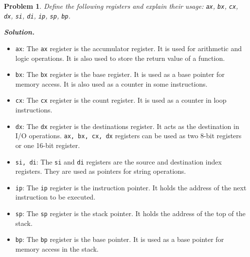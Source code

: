 \documentclass[12pt]{article}
\newtheorem{problem}{Problem}
\newenvironment{solution}[1][\it{Solution}]{\textbf{#1. } }{}
\begin{document}
\begin{problem}
    Define the following registers and explain their usage: \texttt{ax}, \texttt{bx}, \texttt{cx}, \texttt{dx}, \texttt{si}, \texttt{di}, \texttt{ip}, \texttt{sp}, \texttt{bp}.
\end{problem}
\begin{solution}
    
\end{solution}
    \begin{itemize}
        \item \texttt{ax}: The \texttt{ax} register is the accumulator register. It is used for arithmetic and logic operations. It is also used to store the return value of a function.
        \item \texttt{bx}: The \texttt{bx} register is the base register. It is used as a base pointer for memory access. It is also used as a counter in some instructions.
        \item \texttt{cx}: The \texttt{cx} register is the count register. It is used as a counter in loop instructions.
        \item \texttt{dx}: The \texttt{dx} register is the destinations register. It acts as the destination in I/O operations. \texttt{ax, bx, cx, dx} registers can be used as two 8-bit registers or one 16-bit register.
        \item \texttt{si, di}: The \texttt{si} and \texttt{di} registers are the source and destination index registers. They are used as pointers for string operations.
        \item \texttt{ip}: The \texttt{ip} register is the instruction pointer. It holds the address of the next instruction to be executed.
        \item \texttt{sp}: The \texttt{sp} register is the stack pointer. It holds the address of the top of the stack.
        \item \texttt{bp}: The \texttt{bp} register is the base pointer. It is used as a base pointer for memory access in the stack.
    \end{itemize}
\end{document}
